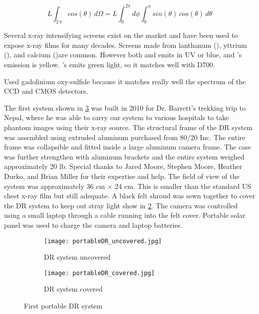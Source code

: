 \begin{equation}\label{eq:lambertian}
L\int_{2\,\pi} cos( \theta)\, d\Omega = L\int_{0}^{2\pi}d\phi \int_{0}^{u} sin(\theta) \, cos(\theta)\, d\theta
\end{equation}
	
Several x-ray intensifying screens exist on the market and have been used to expose x-ray films for many decades.  Screens made from lanthanum (), yttrium (), and calcium ()are common.  However both  and  emits in UV or blue, and 's emission is yellow.  's emits green light, so it matches well with D700.

Used gadolinium oxy-sulfide because it matches really well the spectrum of the CCD and CMOS detectors.

The first system shown in \ref{fig:DR1} was built in 2010 for Dr. Barrett's trekking trip to Nepal, where he was able to carry our system to various hospitals to take phantom images using their x-ray source. The structural frame of the DR system was assembled using extruded aluminum purchased from 80/20 Inc.  The entire frame was collapsible and fitted inside a large aluminum camera frame.  The case was further strengthen with aluminum brackets and the entire system weighed approximately 20 lb.  Special thanks to Jared Moore, Stephen Moore, Heather Durko, and Brian Miller for their expertise and help.  The field of view of the system was approximately 36 cm $\times$ 24 cm.  This is smaller than the standard US chest x-ray film but still adequate.  A black felt shroud was sewn together to cover the DR system to keep out stray light show in \ref{fig:DR1covered}.  The camera was controlled using a small laptop through a cable running into the felt cover.  Portable solar panel was used to charge the camera and laptop batteries.

\begin{figure}[ht]
\centering
	\begin{subfigure}[b]{0.4\linewidth}
	\texttt{[image: portableDR\_uncovered.jpg]}
	\caption{DR system uncovered}
	\label{fig:DR1uncovered}
	\end{subfigure}
\hspace{0.2cm}
	\begin{subfigure}[b]{0.4\linewidth}
	\centering
	\texttt{[image: portableDR\_covered.jpg]}
	\caption{DR system covered}
	\label{fig:DR1covered}
	\end{subfigure}
\caption{First portable DR system}
\label{fig:DR1}
\end{figure}

